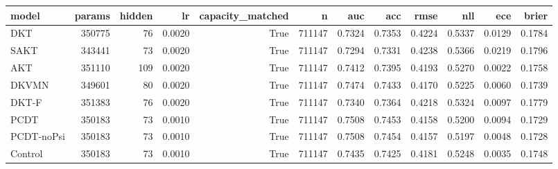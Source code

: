 \begin{tabular}{lrrrrrrrrrrr}
\toprule
model & params & hidden & lr & capacity\_matched & n & auc & acc & rmse & nll & ece & brier \\
\midrule
DKT & 350775 & 76 & 0.0020 & True & 711147 & 0.7324 & 0.7353 & 0.4224 & 0.5337 & 0.0129 & 0.1784 \\
SAKT & 343441 & 73 & 0.0020 & True & 711147 & 0.7294 & 0.7331 & 0.4238 & 0.5366 & 0.0219 & 0.1796 \\
AKT & 351110 & 109 & 0.0020 & True & 711147 & 0.7412 & 0.7395 & 0.4193 & 0.5270 & 0.0022 & 0.1758 \\
DKVMN & 349601 & 80 & 0.0020 & True & 711147 & 0.7474 & 0.7433 & 0.4170 & 0.5225 & 0.0060 & 0.1739 \\
DKT-F & 351383 & 76 & 0.0020 & True & 711147 & 0.7340 & 0.7364 & 0.4218 & 0.5324 & 0.0097 & 0.1779 \\
PCDT & 350183 & 73 & 0.0010 & True & 711147 & 0.7508 & 0.7453 & 0.4158 & 0.5200 & 0.0094 & 0.1729 \\
PCDT-noPsi & 350183 & 73 & 0.0010 & True & 711147 & 0.7508 & 0.7454 & 0.4157 & 0.5197 & 0.0048 & 0.1728 \\
Control & 350183 & 73 & 0.0010 & True & 711147 & 0.7435 & 0.7425 & 0.4181 & 0.5248 & 0.0035 & 0.1748 \\
\bottomrule
\end{tabular}
